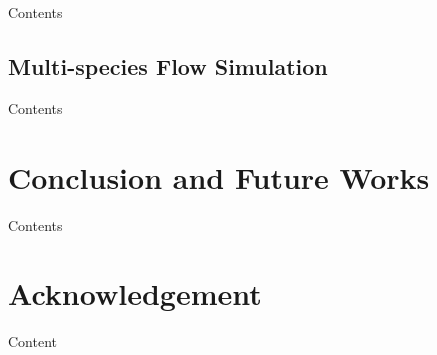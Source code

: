 \documentclass[]{aiaa-tc}%
\begin{document}
Contents

\subsection{Multi-species Flow Simulation}
\label{sec:result_multi}

Contents


\section{Conclusion and Future Works}
\label{sec:conclusion}

Contents


\section*{Acknowledgement}

Content





\end{document}

